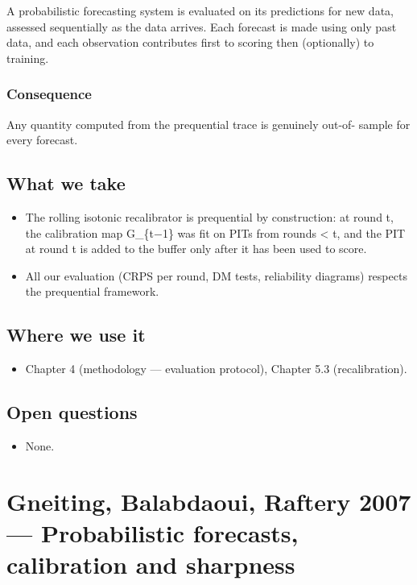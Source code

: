 \documentclass[11pt,a4paper,openany]{report}
\begin{document}
A probabilistic forecasting system is evaluated on its predictions for
new data, assessed sequentially as the data arrives. Each forecast is
made using only past data, and each observation contributes first to
scoring then (optionally) to training.

\subsection{Consequence}

Any quantity computed from the prequential trace is genuinely out-of-
sample for every forecast.

\section{What we take}

\begin{itemize}
  \item The rolling isotonic recalibrator is prequential by construction:
    at round t, the calibration map G\_\{t−1\} was fit on PITs from rounds
    < t, and the PIT at round t is added to the buffer only after it
    has been used to score.
  \item All our evaluation (CRPS per round, DM tests, reliability diagrams)
    respects the prequential framework.
\end{itemize}

\section{Where we use it}

\begin{itemize}
  \item Chapter 4 (methodology — evaluation protocol), Chapter 5.3
    (recalibration).
\end{itemize}

\section{Open questions}

\begin{itemize}
  \item None.
\end{itemize}

\chapter{Gneiting, Balabdaoui, Raftery 2007 — Probabilistic forecasts, calibration and sharpness}
\end{document}
